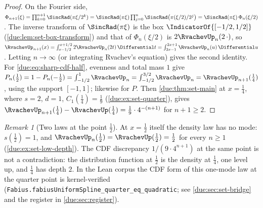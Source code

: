 \documentclass[11pt,oneside]{article}
\theoremstyle{plain}
\theoremstyle{definition}
\theoremstyle{remark}
\newtheorem{remark}[theorem]{Remark}
\newcommand{\upn}[1]{\RvachevUp_{#1}}
\newcommand{\Phin}[1]{\Phi_{#1}}                            %
\newcommand{\dep}[1]{s\!\left(#1\right)}                    %
\newcommand{\Cr}[2]{C_{#1}\!\left(#2\right)}                %
\begin{document}
\begin{proof}
On the Fourier side, $\Phin{n+1}(\xi)=\prod_{k=0}^{n+1}\SincRad(\pi\xi/2^{k})
=\SincRad(\pi\xi)\prod_{j=0}^{n}\SincRad\bigl(\pi(\xi/2)/2^{j}\bigr)
=\SincRad(\pi\xi)\,\Phin{n}(\xi/2)$.  The inverse transform of
$\SincRad(\pi\xi)$ is the box $\IndicatorOf{[-1/2,1/2]}$
(\cref{due:lem:set-box-transform}) and that of $\Phin{n}(\xi/2)$ is
$2\upn{n}(2\,\cdot)$, so $\upn{n+1}(x)=\int_{x-1/2}^{x+1/2}2\upn{n}(2t)\,\Differential t
=\int_{2x-1}^{2x+1}\upn{n}(u)\,\Differential u$.  Letting $n\to\infty$ (or
integrating Rvachev's equation) gives the second identity.  For
\cref{due:eq:sharp-cdf-half}, evenness and total mass $1$ give
$P_{n}(\tfrac12)=1-P_{n}(-\tfrac12)=\int_{-1/2}^{1}\upn{n}
=\int_{-1/2}^{3/2}\upn{n}=\upn{n+1}(\tfrac14)$, using the support
$[-1,1]$; likewise for $P$.  Then \cref{due:thm:set-main} at $x=\tfrac14$,
where $s=2$, $d=1$, $\Cr{1}{\tfrac14}=\tfrac19$
(\cref{due:ex:set-quarter}), gives
$\upn{n+1}(\tfrac14)-\RvachevUp(\tfrac14)=\tfrac19\cdot4^{-(n+1)}$ for
$n+1\ge2$.
\end{proof}

\begin{remark}[Two laws at the point $\tfrac12$]
\label{due:rmk:sharp-half}
At $x=\tfrac12$ itself the density law has no mode: $\dep{\tfrac12}=1$, and
$\upn{n}(\tfrac12)=\RvachevUp(\tfrac12)=\tfrac12$ for every $n\ge1$
(\cref{due:ex:set-low-depth}).  The CDF discrepancy $1/(9\cdot4^{n+1})$ at
the same point is not a contradiction: the distribution function at
$\tfrac12$ is the density at $\tfrac14$, one level up, and $\tfrac14$ has
depth $2$.  In the Lean corpus the CDF form of this one-mode law at the
quarter point is kernel-verified
(\texttt{Fabius.\allowbreak fabiusUniformSpline\_\allowbreak quarter\_\allowbreak eq\_\allowbreak quadratic}; see
\cref{due:sec:set-bridge} and the register in \cref{due:sec:register}).
\end{remark}
\end{document}
